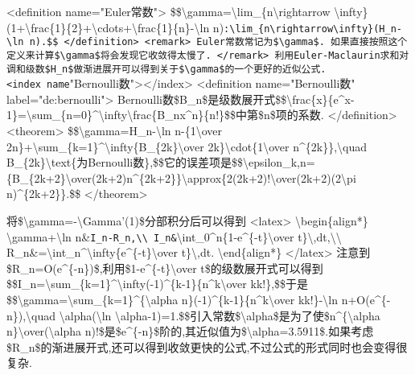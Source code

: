 \documentclass[
]{article}
\begin{document}
\textless definition name="Euler常数"\textgreater{}
\$\$\textbackslash gamma=\textbackslash lim\_\{n\textbackslash rightarrow
\textbackslash infty\}
(1+\textbackslash frac\{1\}\{2\}+\textbackslash cdots+\textbackslash frac\{1\}\{n\}-\textbackslash ln
n)\texttt{:\textbackslash{}lim\_\{n\textbackslash{}rightarrow\textbackslash{}infty\}(H\_n-\textbackslash{}ln\ n).\$\$
\textless{}/definition\textgreater{}
\textless{}remark\textgreater{}
Euler常数常记为\$\textbackslash{}gamma\$.\ 如果直接按照这个定义来计算\$\textbackslash{}gamma\$将会发现它收敛得太慢了.
\textless{}/remark\textgreater{}
利用Euler-Maclaurin求和对调和级数\$H\_n\$做渐进展开可以得到关于\$\textbackslash{}gamma\$的一个更好的近似公式.
\textless{}index\ name}"Bernoulli数"\textgreater\textless/index\textgreater{}
\textless definition name="Bernoulli数"
label="de:bernoulli"\textgreater{}
Bernoulli数\$B\_n\$是级数展开式\$\$\textbackslash frac\{x\}\{e\^{}x-1\}=\textbackslash sum\_\{n=0\}\^{}\textbackslash infty\textbackslash frac\{B\_nx\^{}n\}\{n!\}\$\$中第\$n\$项的系数.
\textless/definition\textgreater{} \textless theorem\textgreater{}
\$\$\textbackslash gamma=H\_n-\textbackslash ln n-\{1\textbackslash over
2n\}+\textbackslash sum\_\{k=1\}\^{}\textbackslash infty\{B\_\{2k\}\textbackslash over
2k\}\textbackslash cdot\{1\textbackslash over
n\^{}\{2k\}\},\textbackslash quad
B\_\{2k\}\textbackslash text\{为Bernoulli数\},\$\$它的误差项是\$\$\textbackslash epsilon\_k,n=\{B\_\{2k+2\}\textbackslash over(2k+2)n\^{}\{2k+2\}\}\textbackslash approx\{2(2k+2)!\textbackslash over(2k+2)(2\textbackslash pi
n)\^{}\{2k+2\}\}.\$\$ \textless/theorem\textgreater{}

将\$\textbackslash gamma=-\textbackslash Gamma'(1)\$分部积分后可以得到
\textless latex\textgreater{} \textbackslash begin\{align*\}
\textbackslash gamma+\textbackslash ln
n\&\texttt{I\_n-R\_n,\textbackslash{}\textbackslash{}
I\_n\&}\textbackslash int\_0\^{}n\{1-e\^{}\{-t\}\textbackslash over
t\}\textbackslash,dt,\textbackslash\textbackslash{}
R\_n\&=\textbackslash int\_n\^{}\textbackslash infty\{e\^{}\{-t\}\textbackslash over
t\}\textbackslash,dt. \textbackslash end\{align*\}
\textless/latex\textgreater{}
注意到\$R\_n=O(e\^{}\{-n\})\$,利用\$1-e\^{}\{-t\}\textbackslash over
t\$的级数展开式可以得到\$\$I\_n=\textbackslash sum\_\{k=1\}\^{}\textbackslash infty(-1)\^{}\{k-1\}\{n\^{}k\textbackslash over
kk!\},\$\$于是\$\$\textbackslash gamma=\textbackslash sum\_\{k=1\}\^{}\{\textbackslash alpha
n\}(-1)\^{}\{k-1\}\{n\^{}k\textbackslash over kk!\}-\textbackslash ln
n+O(e\^{}\{-n\}),\textbackslash quad
\textbackslash alpha(\textbackslash ln
\textbackslash alpha-1)=1.\$\$引入常数\$\textbackslash alpha\$是为了使\$n\^{}\{\textbackslash alpha
n\}\textbackslash over(\textbackslash alpha
n)!\$是\$e\^{}\{-n\}\$阶的,其近似值为\$\textbackslash alpha=3.5911\$.如果考虑\$R\_n\$的渐进展开式,还可以得到收敛更快的公式,不过公式的形式同时也会变得很复杂.
\end{document}
